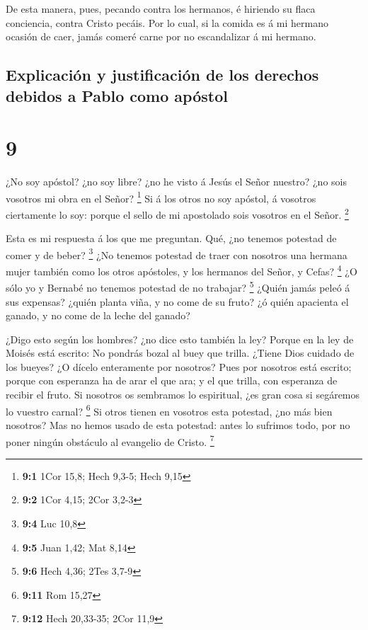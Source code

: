  De esta manera, pues, pecando contra los hermanos, é
hiriendo su flaca conciencia, contra Cristo pecáis.  Por lo
cual, si la comida es á mi hermano ocasión de caer, jamás comeré carne
por no escandalizar á mi hermano.

\hypertarget{explicaciuxf3n-y-justificaciuxf3n-de-los-derechos-debidos-a-pablo-como-apuxf3stol}{%
\subsection{Explicación y justificación de los derechos debidos a Pablo
como
apóstol}\label{explicaciuxf3n-y-justificaciuxf3n-de-los-derechos-debidos-a-pablo-como-apuxf3stol}}

\hypertarget{section-8}{%
\section{9}\label{section-8}}

 ¿No soy apóstol? ¿no soy libre? ¿no he visto á Jesús el
Señor nuestro? ¿no sois vosotros mi obra en el Señor? \footnote{\textbf{9:1}
  1Cor 15,8; Hech 9,3-5; Hech 9,15}  Si á los otros no soy
apóstol, á vosotros ciertamente lo soy: porque el sello de mi apostolado
sois vosotros en el Señor. \footnote{\textbf{9:2} 1Cor 4,15; 2Cor 3,2-3}

 Esta es mi respuesta á los que me preguntan. 
Qué, ¿no tenemos potestad de comer y de beber? \footnote{\textbf{9:4}
  Luc 10,8}  ¿No tenemos potestad de traer con nosotros una
hermana mujer también como los otros apóstoles, y los hermanos del
Señor, y Cefas? \footnote{\textbf{9:5} Juan 1,42; Mat 8,14} 
¿O sólo yo y Bernabé no tenemos potestad de no trabajar? \footnote{\textbf{9:6}
  Hech 4,36; 2Tes 3,7-9}  ¿Quién jamás peleó á sus expensas?
¿quién planta viña, y no come de su fruto? ¿ó quién apacienta el ganado,
y no come de la leche del ganado?

 ¿Digo esto según los hombres? ¿no dice esto también la ley?
 Porque en la ley de Moisés está escrito: No pondrás bozal
al buey que trilla. ¿Tiene Dios cuidado de los bueyes?  ¿O
dícelo enteramente por nosotros? Pues por nosotros está escrito; porque
con esperanza ha de arar el que ara; y el que trilla, con esperanza de
recibir el fruto.  Si nosotros os sembramos lo espiritual,
¿es gran cosa si segáremos lo vuestro carnal? \footnote{\textbf{9:11}
  Rom 15,27}  Si otros tienen en vosotros esta potestad,
¿no más bien nosotros? Mas no hemos usado de esta potestad: antes lo
sufrimos todo, por no poner ningún obstáculo al evangelio de Cristo.
\footnote{\textbf{9:12} Hech 20,33-35; 2Cor 11,9}

